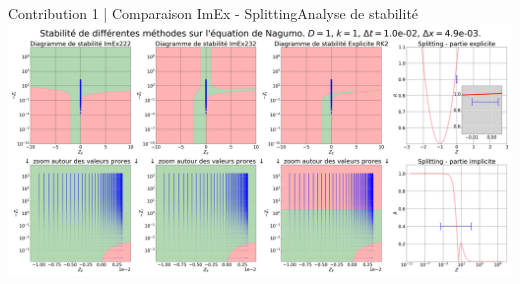 \begin{frame}{Contribution 1 | Comparaison ImEx - Splitting}{Analyse de stabilité}
    \includegraphics[width = \textwidth]{medias/2_/1_/STABILITE_D1_k1_dt1.0e-02_dx4.9e-03.png}
\end{frame}